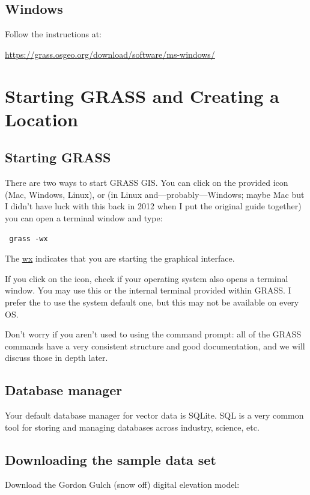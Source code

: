 \documentclass{book}
\begin{document}
\section{Windows}

Follow the instructions at:

\url{https://grass.osgeo.org/download/software/ms-windows/}

\chapter{Starting GRASS and Creating a Location}

\section{Starting GRASS}

There are two ways to start GRASS GIS. You can click on the provided icon (Mac, Windows, Linux), or (in Linux and---probably---Windows; maybe Mac but I didn't have luck with this back in 2012 when I put the original guide together) you can open a terminal window and type:
\begin{lstlisting}
 grass -wx
\end{lstlisting}
The \url{wx} indicates that you are starting the graphical interface.

If you click on the icon, check if your operating system also opens a terminal window. You may use this or the internal terminal provided within GRASS. I prefer the to use the system default one, but this may not be available on every OS.

Don't worry if you aren't used to using the command prompt: all of the GRASS commands have a very consistent structure and good documentation, and we will discuss those in depth later.

\section{Database manager \label{s:database}}

Your default database manager for vector data is SQLite. SQL is a very common tool for storing and managing databases across industry, science, etc.

\section{Downloading the sample data set}

Download the Gordon Gulch (snow off) digital elevation model:
\end{document}
